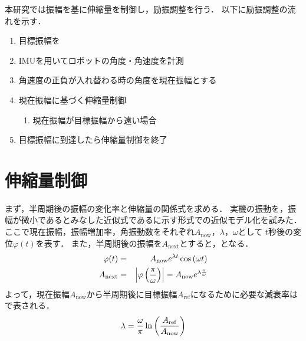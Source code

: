           本研究では振幅を基に伸縮量を制御し，励振調整を行う．
          以下に励振調整の流れを示す．
          \begin{enumerate}
            \item 目標振幅を
            \item IMUを用いてロボットの角度・角速度を計測
            \item 角速度の正負が入れ替わる時の角度を現在振幅とする
            \item 現在振幅に基づく伸縮量制御
            \begin{enumerate}
              \item 現在振幅が目標振幅から遠い場合
            \end{enumerate}
            \item 目標振幅に到達したら伸縮量制御を終了
          \end{enumerate}

          \section{伸縮量制御}

          まず，半周期後の振幅の変化率と伸縮量の関係式を求める．
          実機の振動を，振幅が微小であるとみなした近似式であるに示す形式での近似モデル化を試みた．
          ここで現在振幅，振幅増加率，角振動数をそれぞれ$A_{\mathrm{now}}$，$\lambda$，$\omega$として
          $t$秒後の変位$\varphi(t)$を表す．
          また，半周期後の振幅を$A_{\mathrm{next}}$とすると，となる．
          \begin{eqnarray}
            \equlabel{Approximation Model}
            \varphi(t)&=&A_{\mathrm{now}}e^{\lambda t}\cos{(\omega t)}\\
            \equlabel{amp rate}
            A_{\mathrm{next}}&=&\left|\varphi\left(\frac{\pi}{\omega}\right)\right|=A_{\mathrm{now}}e^{\lambda \frac{\pi}{\omega}}
          \end{eqnarray}
          よって，現在振幅$A_{\mathrm{now}}$から半周期後に目標振幅$A_{\mathrm{ref}}$になるために必要な減衰率はで表される．
          \begin{eqnarray}
            \equlabel{lambda}
            \lambda=\frac{\omega}{\pi}\ln{\left(\frac{A_{\mathrm{ref}}}{A_{\mathrm{now}}}\right)}
          \end{eqnarray}

